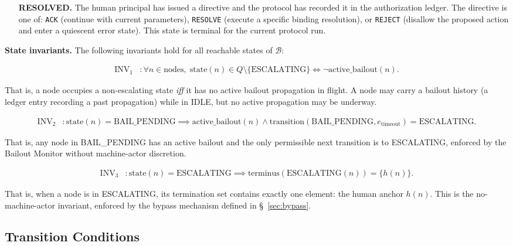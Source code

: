 \begin{itemize}
\item[\textbf{RESOLVED.}] The human principal has issued a directive and the protocol has recorded it in the authorization ledger. The directive is one of: \texttt{ACK} (continue with current parameters), \texttt{RESOLVE} (execute a specific binding resolution), or \texttt{REJECT} (disallow the proposed action and enter a quiescent error state). This state is terminal for the current protocol run.
\end{itemize}

\bigskip
\noindent\textbf{State invariants.} The following invariants hold for all reachable states of $\mathcal{B}$:

\begin{align}
\text{INV}_1 &: \forall n \in \text{nodes},\; \text{state}(n) \in Q \setminus \{\text{ESCALATING}\} \iff \neg\text{active\_bailout}(n). \tag{INV-1}
\end{align}

That is, a node occupies a non-escalating state \emph{iff} it has no active bailout propagation in flight. A node may carry a bailout history (a ledger entry recording a past propagation) while in IDLE, but no active propagation may be underway.

\begin{align}
\text{INV}_2 &: \text{state}(n) = \text{BAIL\_PENDING} \implies \text{active\_bailout}(n) \land \text{transition}(\text{BAIL\_PENDING}, e_{\text{timeout}}) = \text{ESCALATING}. \tag{INV-2}
\end{align}

That is, any node in BAIL\_PENDING has an active bailout and the only permissible next transition is to ESCALATING, enforced by the Bailout Monitor without machine-actor discretion.

\begin{align}
\text{INV}_3 &: \text{state}(n) = \text{ESCALATING} \implies \text{terminus}(\text{ESCALATING}(n)) = \{h(n)\}. \tag{INV-3}
\end{align}

That is, when a node is in ESCALATING, its termination set contains exactly one element: the human anchor $h(n)$. This is the no-machine-actor invariant, enforced by the bypass mechanism defined in \S~\ref{sec:bypass}.

\subsection{Transition Conditions}\label{sec:transition-conditions}

